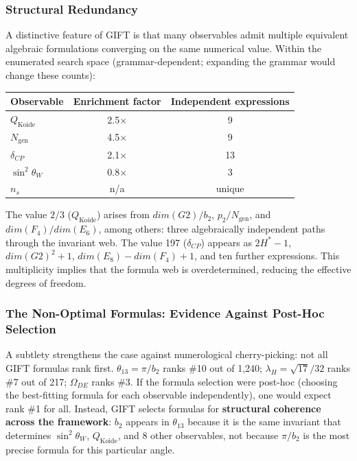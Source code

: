 \documentclass[11pt,a4paper]{article}
\newcommand{\E}{\mathrm{E}}
\newcommand{\Gtwo}{\mathrm{G}_2}
\newcommand{\dimE}{\mathrm{dim}}
\newcommand{\CP}{\mathrm{CP}}
\newcommand{\DE}{\mathrm{DE}}
\def\CP{CP}%
\def\Gtwo{G2}%
\def\E{E}%
\def\dimE{dim}%
\def\DE{DE}%
\begin{document}
\subsubsection{Structural Redundancy}

A distinctive feature of GIFT is that many observables admit multiple equivalent algebraic formulations converging on the same numerical value. Within the enumerated search space (grammar-dependent; expanding the grammar would change these counts):

\begin{table}[H]
\centering
\begin{tabular}{lcc}
\toprule
Observable & Enrichment factor & Independent expressions \\
\midrule
$Q_{\mathrm{Koide}}$ & 2.5$\times$ & 9 \\
$N_{\mathrm{gen}}$ & 4.5$\times$ & 9 \\
$\delta_{\CP}$ & 2.1$\times$ & 13 \\
$\sin^2\theta_W$ & 0.8$\times$ & 3 \\
$n_s$ & n/a & unique \\
\bottomrule
\end{tabular}
\end{table}

The value $2/3$ ($Q_{\mathrm{Koide}}$) arises from $\dimE(\Gtwo)/b_2$, $p_2/N_{\mathrm{gen}}$, and $\dimE(F_4)/\dimE(\E_6)$, among others: three algebraically independent paths through the invariant web. The value 197 ($\delta_{\CP}$) appears as $2H^*-1$, $\dimE(\Gtwo)^2 + 1$, $\dimE(\E_8) - \dimE(F_4) + 1$, and ten further expressions. This multiplicity implies that the formula web is overdetermined, reducing the effective degrees of freedom.

\subsubsection{The Non-Optimal Formulas: Evidence Against Post-Hoc Selection}

A subtlety strengthens the case against numerological cherry-picking: not all GIFT formulas rank first. $\theta_{13} = \pi/b_2$ ranks \#10 out of 1,240; $\lambda_H = \sqrt{17}/32$ ranks \#7 out of 217; $\Omega_{\DE}$ ranks \#3. If the formula selection were post-hoc (choosing the best-fitting formula for each observable independently), one would expect rank \#1 for all. Instead, GIFT selects formulas for \textbf{structural coherence across the framework}: $b_2$ appears in $\theta_{13}$ because it is the same invariant that determines $\sin^2\theta_W$, $Q_{\mathrm{Koide}}$, and 8 other observables, not because $\pi/b_2$ is the most precise formula for this particular angle.
\end{document}

